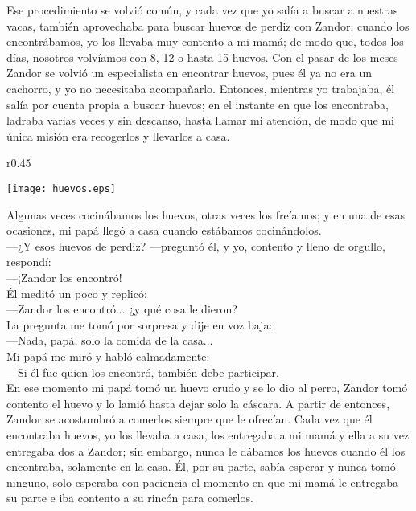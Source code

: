 Ese procedimiento se volvió común, y cada vez que yo salía a buscar a nuestras vacas, también aprovechaba para buscar huevos de perdiz con Zandor; cuando los encontrábamos, yo los llevaba muy contento a mi mamá; de modo que, todos los días, nosotros volvíamos con 8, 12 o hasta 15 huevos.
Con el pasar de los meses Zandor se volvió un especialista en encontrar huevos, pues él ya no era un cachorro, y yo no necesitaba acompañarlo. 
Entonces, mientras yo trabajaba, él salía por cuenta propia a buscar huevos; en el instante en que los encontraba, ladraba varias veces y sin descanso, hasta llamar mi atención, de modo que mi única misión era recogerlos y llevarlos a casa.
\ifdefined\EnableIncludeImages
\begin{wrapfigure}{r}{0.45\textwidth}
  \begin{center}
  \vspace{-20pt}
    \texttt{[image: huevos.eps]}
  \end{center}
  \vspace{-20pt}
\end{wrapfigure}
\fi
Algunas veces cocinábamos los huevos, otras veces los freíamos; y en una de esas ocasiones, mi papá llegó a casa cuando estábamos cocinándolos.\\\indent
---¿Y esos huevos de perdiz? ---preguntó él, 
y yo, contento y lleno de orgullo, respondí:\\\indent
---¡Zandor los encontró!\\\indent
Él meditó un poco y replicó:\\\indent 
---Zandor los encontró... ¿y qué cosa le dieron?\\\indent 
La pregunta me tomó por sorpresa y dije en voz baja:\\\indent 
---Nada, papá, solo la comida de la casa...\\\indent
Mi papá me miró y habló calmadamente:\\\indent 
---Si él fue quien los encontró, también debe participar.\\\indent
En ese momento mi papá tomó un huevo crudo y se lo dio al perro, Zandor tomó contento el huevo y lo lamió hasta dejar solo la cáscara. 
A partir de entonces, Zandor se acostumbró a comerlos siempre que le ofrecían. 
Cada vez que él encontraba huevos, yo los llevaba a casa, los entregaba a mi mamá y ella a su vez entregaba dos a Zandor; sin embargo, nunca le dábamos los huevos cuando él los encontraba, solamente en la casa. 
Él, por su parte, sabía esperar y nunca tomó ninguno, solo esperaba con paciencia el momento en que mi mamá le entregaba su parte e iba contento a su rincón para comerlos.


